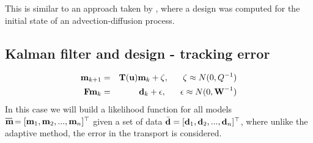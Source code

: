\documentclass[12pt]{article}
\newcommand {\bfd}   { {\bf d} }
\newcommand {\bfu}   { {\bf u} }
\newcommand {\bfm}   { {\bf m} }
\newcommand {\bfF}  { {\bf F} }
\newcommand{\bT}  {\text{\bf T}} %
\newcommand{\W}{\text{\bf W}}
\newcommand*\xbar[1]{%
  \hbox{%
    \vbox{%
      \hrule height 0.5pt %
      \kern0.5ex%
      \hbox{%
        \kern-0.em%
        \ensuremath{#1}%
        \kern-0.15em%
      }%
    }%
  }%
}
\newcommand{\mbar}{\xbar{\bf m}}
\begin{document}
This is similar to an approach taken by \cite{Alexanderian2014}, where a design was computed for the initial state of an advection-diffusion process. 
\subsection{Kalman filter and design - tracking error}
\begin{eqnarray}
\bfm _{k+1} &=& \bT(\bfu)\bfm_k + \zeta, \;\;\;\;\;\; \zeta \approx N(0,Q^{-1})\\
 \bfF \bfm_k &=& \bfd_k  + {\bf \epsilon},\;\;\;\;\;\; \epsilon \approx N(0,\W^{-1})
\end{eqnarray}
In this case we will build a likelihood function for all  models $\mbar = [\bfm_1,\bfm_2,...,\bfm_n]^{\top}$ given a set of data $\bar{\bfd} = [\bfd_1,\bfd_2,...,\bfd_n]^{\top}$, where unlike the adaptive method, the error in the transport is considered. 
\end{document}
